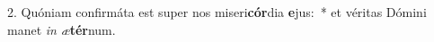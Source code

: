 2. Quóniam confirmáta est super nos miseri\textbf{cór}dia \textbf{e}jus:~*  et véritas Dómini manet \textit{in} \textit{æ}\textbf{tér}num.\

